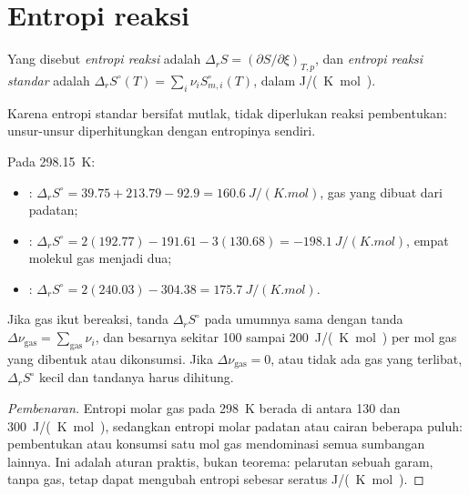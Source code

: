 \section{Entropi reaksi}

\begin{definition}\label{def:b2:reaction-free-energy:reaction-entropy}
Yang disebut \emph{entropi reaksi} adalah
$\Delta_r S =
(\partial S/\partial\xi)_{T,p}$, dan \emph{entropi reaksi
standar} adalah $\Delta_r S^\circ(T) =
\sum_i\nu_iS^\circ_{m,i}(T)$, dalam \unit{J/(K.mol)}.
\end{definition}

Karena entropi standar bersifat mutlak, tidak diperlukan reaksi
pembentukan: unsur-unsur diperhitungkan dengan entropinya sendiri.

\begin{example}\label{ex:b2:reaction-free-energy:entropies}
Pada \qty{298.15}{K}:
\begin{itemize}
  \item {}: $\Delta_r S^\circ = 39.75 + 213.79 -
        92.9 = \qty{+160.6}{J/(K.mol)}$, gas yang dibuat dari padatan;
  \item {}: $\Delta_r S^\circ = 2(192.77) -
        191.61 - 3(130.68) = \qty{-198.1}{J/(K.mol)}$, empat molekul gas
        menjadi dua;
  \item {}: $\Delta_r S^\circ = 2(240.03) - 304.38 =
        \qty{+175.7}{J/(K.mol)}$.
\end{itemize}
\end{example}

\begin{proposition}\label{prop:b2:reaction-free-energy:sign-rule}
Jika gas ikut bereaksi, tanda $\Delta_r S^\circ$ pada umumnya sama dengan
tanda $\Delta\nu_{\text{gas}} = \sum_{\text{gas}}\nu_i$, dan besarnya
sekitar \qty{100}{} sampai \qty{200}{J/(K.mol)} per mol gas yang dibentuk
atau dikonsumsi. Jika $\Delta\nu_{\text{gas}} = 0$, atau tidak ada gas
yang terlibat, $\Delta_r S^\circ$ kecil dan tandanya harus dihitung.
\end{proposition}

\begin{proof}[Pembenaran]
Entropi molar gas pada \qty{298}{K} berada di antara 130 dan
\qty{300}{J/(K.mol)}, sedangkan entropi molar padatan atau cairan beberapa
puluh: pembentukan atau konsumsi satu mol gas mendominasi semua
sumbangan lainnya. Ini adalah aturan praktis, bukan teorema: pelarutan
sebuah garam, tanpa gas, tetap dapat mengubah entropi sebesar seratus
\unit{J/(K.mol)}.
\end{proof}

